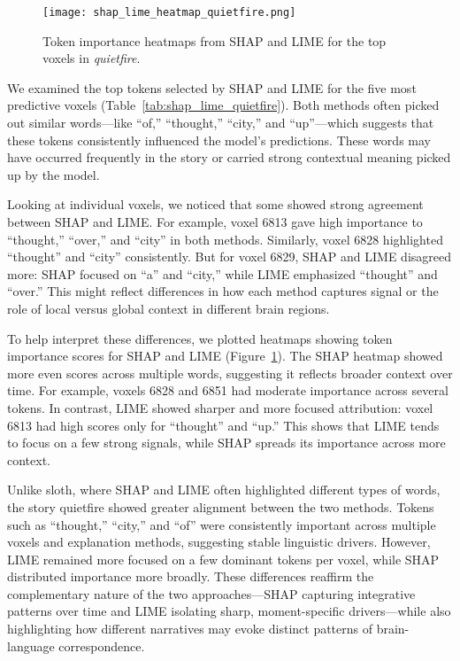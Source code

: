 \documentclass{article}
\begin{document}
\begin{figure}[h]
\centering
\texttt{[image: shap\_lime\_heatmap\_quietfire.png]}
\caption{Token importance heatmaps from SHAP and LIME for the top voxels in \textit{quietfire}.}
\label{fig:shap_lime_heatmap_quietfire}
\end{figure}

We examined the top tokens selected by SHAP and LIME for the five most predictive voxels (Table~\ref{tab:shap_lime_quietfire}). Both methods often picked out similar words—like “of,” “thought,” “city,” and “up”—which suggests that these tokens consistently influenced the model’s predictions. These words may have occurred frequently in the story or carried strong contextual meaning picked up by the model.

Looking at individual voxels, we noticed that some showed strong agreement between SHAP and LIME. For example, voxel 6813 gave high importance to “thought,” “over,” and “city” in both methods. Similarly, voxel 6828 highlighted “thought” and “city” consistently. But for voxel 6829, SHAP and LIME disagreed more: SHAP focused on “a” and “city,” while LIME emphasized “thought” and “over.” This might reflect differences in how each method captures signal or the role of local versus global context in different brain regions.

To help interpret these differences, we plotted heatmaps showing token importance scores for SHAP and LIME (Figure~\ref{fig:shap_lime_heatmap_quietfire}). The SHAP heatmap showed more even scores across multiple words, suggesting it reflects broader context over time. For example, voxels 6828 and 6851 had moderate importance across several tokens. In contrast, LIME showed sharper and more focused attribution: voxel 6813 had high scores only for “thought” and “up.” This shows that LIME tends to focus on a few strong signals, while SHAP spreads its importance across more context.

Unlike sloth, where SHAP and LIME often highlighted different types of words, the story quietfire showed greater alignment between the two methods. Tokens such as “thought,” “city,” and “of” were consistently important across multiple voxels and explanation methods, suggesting stable linguistic drivers. However, LIME remained more focused on a few dominant tokens per voxel, while SHAP distributed importance more broadly. These differences reaffirm the complementary nature of the two approaches—SHAP capturing integrative patterns over time and LIME isolating sharp, moment-specific drivers—while also highlighting how different narratives may evoke distinct patterns of brain-language correspondence.
\end{document}
